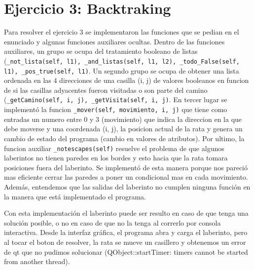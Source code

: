 \documentclass[12pt,a4paper,titlepage]{article}
\begin{document}
\section{Ejercicio 3: Backtraking}

Para resolver el ejercicio 3 se implementaron las funciones que se pedian en el enunciado y algunas funciones auxiliares ocultas. Dentro de las funciones auxiliares, un grupo se ocupa del tratamiento booleano de listas (\texttt{\_not\_lista(self, l1), \_and\_listas(self, l1, l2), \_todo\_False(self, l1), \_pos\_true(self, l1)}. Un segundo grupo se ocupa de obtener una lista ordenada en las 4 direcciones de una casilla (i, j) de valores booleanos en funcion de si las casillas adyacentes fueron visitadas o son parte del camino (\texttt{\_getCamino(self, i, j), \_getVisita(self, i, j)}. En tercer lugar se implementó la funcion \texttt{\_mover(self, movimiento, i, j)} que tiene como entradas un numero entre 0 y 3 (movimiento) que indica la direccion en la que debe moverse y una coordenada (i, j), la posicion actual de la rata y genera un cambio de estado del programa (cambio en valores de atributos). Por ultimo, la funcion auxiliar \texttt{\_notescapes(self)} resuelve el problema de que algunos laberintos no tienen paredes en los bordes y esto hacia que la rata tomara posiciones fuera del laberinto. Se implementó de esta manera porque nos pareció mas eficiente cerrar las paredes a poner un condicional mas en cada movimiento. Además, entendemos que las salidas del laberinto no cumplen ninguna función en la manera que está implementado el programa.\par
Con esta implementación el laberinto puede ser resulto en caso de que tenga una solución posible, o no en caso de que no la tenga al correrlo por consola interactiva. Desde la interfaz gráfica, el programa abra y carga el laberinto, pero al tocar el boton de resolver, la rata se mueve un casillero y obtenemos un error de qt que no pudimos solucionar (QObject::startTimer: timers cannot be started from another thread).
\end{document}
